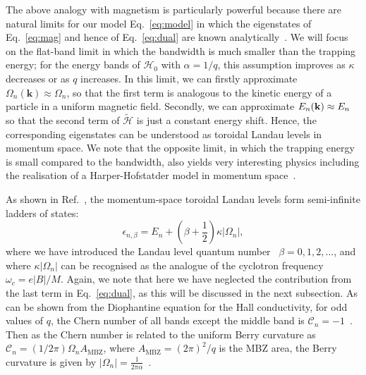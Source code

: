 The above analogy with magnetism is particularly powerful because
there are natural limits for our model Eq.~\eqref{eq:model} in which the
eigenstates of Eq.~\eqref{eq:mag} and hence of Eq.~\eqref{eq:dual} are
known analytically~\cite{price2014magnetic, ozawa2014momhh,
Claassen_prl_2015}. We will focus on the flat-band limit in which the
bandwidth is much smaller than the trapping energy; for the energy
bands of $\mathcal{H}_0$ with $\alpha = 1/q$, this assumption improves
as $\kappa$ decreases or as $q$ increases. In this limit, we can
firstly approximate $\Omega_{n}(\mathbf{k}) \approx \Omega_n$, so that
the first term is analogous to the kinetic energy of a particle in a
uniform magnetic field. Secondly, we can approximate $E_n(\mathbf{k})
\approx E_n$ so that the second term of $\widetilde{\mathcal{H}}$ is
just a constant energy shift. Hence, the corresponding eigenstates can
be understood as toroidal Landau levels in momentum space. We note
that the opposite limit, in which the trapping energy is small
compared to the bandwidth, also yields very interesting physics
including the realisation of a Harper-Hofstatder model in momentum
space~\cite{ozawa2014momhh, scaffidi2014exact}.

As shown in Ref.~\cite{price2014magnetic}, the momentum-space toroidal
Landau levels form semi-infinite ladders of states:
%
\begin{equation}\label{eq:ladders} \epsilon_{n,\beta} = E_n +
\left(\beta + \frac{1}{2}\right) \kappa |\Omega_n| ,
\end{equation} where we have introduced the Landau level quantum
number~\cite{Landau:101810} $\beta = 0,1,2,\dots$, and where $\kappa
|\Omega_n|$ can be
recognised as the analogue of the cyclotron frequency $\omega_c = e
|B| /M $. Again, we note that here we have neglected the contribution
from the last term in Eq.~\eqref{eq:dual}, as this will be discussed in
the next subsection. As can be shown from the Diophantine equation for
the Hall conductivity, for odd values of $q$, the Chern number of all
bands except the middle band is $\mathcal{C}_n =
-1$~\cite{bernevig2013topological}. Then as the Chern number is
related to the uniform Berry curvature as $\mathcal{C}_n = (1/2\pi)
\Omega_n A_{\text{MBZ}}$, where $A_{\text{MBZ}} = (2\pi)^2/q$ is the
MBZ area, the Berry curvature is given by $|\Omega_n| =
\frac{1}{2\pi\alpha}$~\cite{price2014magnetic}.

